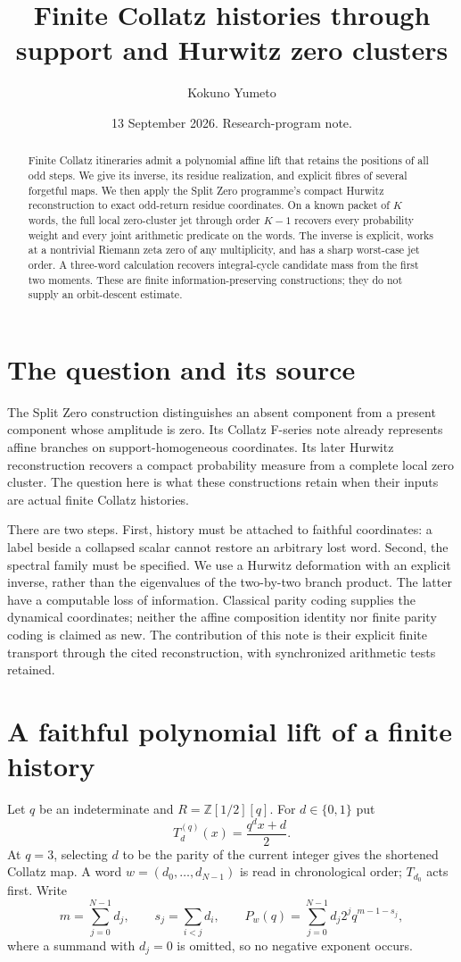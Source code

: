\documentclass[11pt]{amsart}
\title{Finite Collatz histories through support and Hurwitz zero clusters}
\author{Kokuno Yumeto}
\date{13 September 2026. Research-program note.}
\theoremstyle{remark}\newtheorem{remark}[theorem]{Remark}
\newcommand{\Z}{\mathbb Z}
\begin{document}
\begin{abstract}
Finite Collatz itineraries admit a polynomial affine lift that retains the
positions of all odd steps. We give its inverse, its residue realization,
and explicit fibres of several forgetful maps. We then apply the Split
Zero programme's compact Hurwitz reconstruction to exact odd-return residue
coordinates. On a known packet of $K$ words, the full local zero-cluster
jet through order $K-1$ recovers every probability weight and every joint
arithmetic predicate on the words. The inverse is explicit, works at a
nontrivial Riemann zeta zero of any multiplicity, and has a sharp worst-case
jet order. A three-word calculation recovers integral-cycle candidate mass
from the first two moments. These are finite information-preserving
constructions; they do not supply an orbit-descent estimate.
\end{abstract}
\maketitle

\section{The question and its source}
The Split Zero construction distinguishes an absent component from a
present component whose amplitude is zero. Its Collatz F-series note
\cite{support} already represents affine branches on support-homogeneous
coordinates. Its later Hurwitz reconstruction \cite{hurwitz} recovers a
compact probability measure from a complete local zero cluster. The
question here is what these constructions retain when their inputs are
actual finite Collatz histories.

There are two steps. First, history must be attached to faithful
coordinates: a label beside a collapsed scalar cannot restore an arbitrary
lost word. Second, the spectral family must be specified. We use a Hurwitz
deformation with an explicit inverse, rather than the eigenvalues of the
two-by-two branch product. The latter have a computable loss of information.
Classical parity coding supplies the dynamical coordinates; neither the
affine composition identity nor finite parity coding is claimed as new.
The contribution of this note is their explicit finite transport through
the cited reconstruction, with synchronized arithmetic tests retained.

\section{A faithful polynomial lift of a finite history}
Let $q$ be an indeterminate and $R=\Z[1/2][q]$. For $d\in\{0,1\}$ put
\[
 T_d^{(q)}(x)=\frac{q^d x+d}{2}.
\]
At $q=3$, selecting $d$ to be the parity of the current integer gives
the shortened Collatz map. A word $w=(d_0,\ldots,d_{N-1})$ is read in
chronological order; $T_{d_0}$ acts first. Write
\[
 m=\sum_{j=0}^{N-1}d_j,\qquad s_j=\sum_{i<j}d_i,\qquad
 P_w(q)=\sum_{j=0}^{N-1}d_j2^j q^{m-1-s_j},
\]
where a summand with $d_j=0$ is omitted, so no negative exponent occurs.
\end{document}
